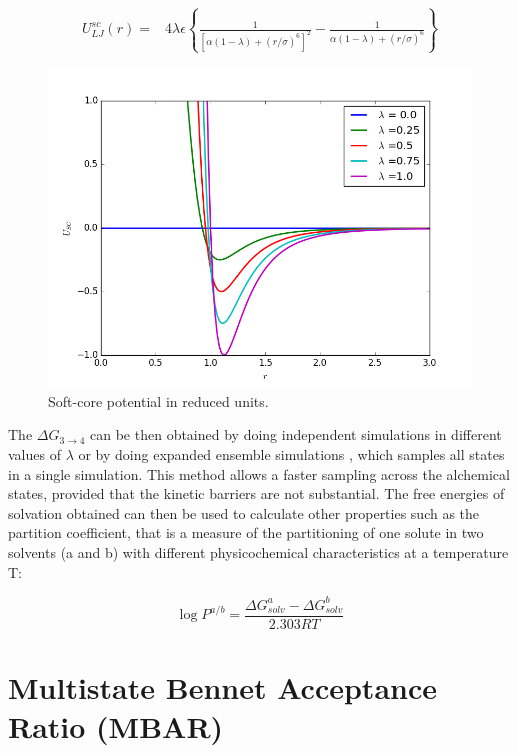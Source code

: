 \begin{equation}
\label{eq:softcoreLJ}
\begin{aligned}
U_{LJ}^{sc}(r) {}=& 4\lambda\epsilon \left\lbrace\frac{1}{\left[\alpha(1-\lambda)+ (r/\sigma)^{6}\right]^{2}} - \frac{1}{\alpha(1-\lambda)+(r/\sigma)^{6}}\right\rbrace
\end{aligned}
\end{equation}

\begin{figure}[H]
	\centering
	\includegraphics[width=0.9\linewidth]{Figures/SC}
	\caption{Soft-core potential in reduced units.}
	\label{fig:SC}
\end{figure}

The $\Delta G_{3 \rightarrow 4}$ can be then obtained by doing independent simulations in different values of $\lambda$ or by doing expanded ensemble simulations \cite{lyubartsev}, which samples all states in a single simulation. This method allows a faster sampling across the alchemical states, provided that the kinetic barriers are not substantial. The free energies of solvation obtained can then be used to calculate other properties such as the partition coefficient, that is a measure of the partitioning of one solute in two solvents (a and b) with different physicochemical characteristics  at a temperature T:

\begin{equation}
\label{eqn:partcoe}
\log{P}^{a/b} = \frac{\Delta G_{solv}^{a} - \Delta G_{solv}^{b}}{2.303RT}
\end{equation}



\section{Multistate Bennet Acceptance Ratio (MBAR)}\label{mbar}

